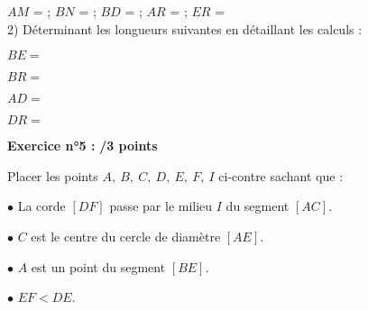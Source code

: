 \documentclass[a4paper,12pt]{article}
\begin{document}
$AM$ = \gap{9 cm} ; \quad $BN$ = \gap{10 cm} ; \quad $BD$ = \gap{10 cm} ; \quad $AR$ = \gap{9 cm} ; \quad $ER$ = \gap{18 cm}\\%
2) Déterminant les longueurs suivantes en détaillant les calculs :

\qquad $BE =$ 

\qquad $BR =$ 

\qquad $AD =$ 

\qquad $DR =$ 

\begin{minipage}{.6\linewidth}
    \bigskip\textbf{Exercice n°5 :}  \hfill \textbf{/3 points}

    \medskip Placer les points $A,\ B,\ C,\ D,\ E,\ F,\ I$ ci-contre sachant que :

    \medskip$\bullet$ La corde $[DF]$ passe par le milieu $I$ du segment $[AC]$.

    \medskip$\bullet$ $C$ est le centre du cercle de diamètre $[AE]$.

    \medskip$\bullet$ $A$ est un point du segment $[BE]$.

    \medskip$\bullet$ $EF<DE$.
\end{minipage}
\hfill
\end{document}
